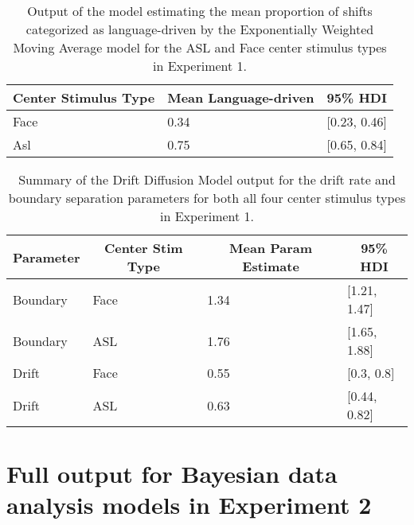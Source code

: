 \documentclass[,man,floatsintext]{apa6}
\begin{document}
\begin{appendix}
\begin{table}[h]
\begin{center}
\begin{threeparttable}
\caption{\label{tab:trio-guess-cuts}Output of the model estimating the mean proportion of shifts categorized as language-driven by the Exponentially Weighted Moving Average model for the ASL and Face center stimulus types in Experiment 1.}
\begin{tabular}{lll}
\toprule
Center Stimulus Type & \multicolumn{1}{c}{Mean Language-driven} & \multicolumn{1}{c}{95\% HDI}\\
\midrule
Face & 0.34 & [0.23, 0.46]\\
Asl & 0.75 & [0.65, 0.84]\\
\bottomrule
\end{tabular}
\end{threeparttable}
\end{center}
\end{table}

\begin{table}[h]
\begin{center}
\begin{threeparttable}
\caption{\label{tab:trio-hddm}Summary of the Drift Diffusion Model output for the drift rate and boundary separation parameters for both all four center stimulus types in Experiment 1.}
\begin{tabular}{llll}
\toprule
Parameter & \multicolumn{1}{c}{Center Stim Type} & \multicolumn{1}{c}{Mean Param Estimate} & \multicolumn{1}{c}{95\% HDI}\\
\midrule
Boundary & Face & 1.34 & [1.21, 1.47]\\
Boundary & ASL & 1.76 & [1.65, 1.88]\\
Drift & Face & 0.55 & [0.3, 0.8]\\
Drift & ASL & 0.63 & [0.44, 0.82]\\
\bottomrule
\end{tabular}
\end{threeparttable}
\end{center}
\end{table}

\hypertarget{full-output-for-bayesian-data-analysis-models-in-experiment-2}{%
\section{Full output for Bayesian data analysis models in Experiment
2}\label{full-output-for-bayesian-data-analysis-models-in-experiment-2}}


\end{appendix}
\end{document}

